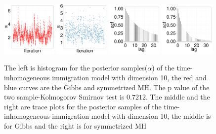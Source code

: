   \begin{figure}[H]
  \centering
  \begin{minipage}[!hp]{0.99\linewidth}
    \includegraphics [width=0.24\textwidth, angle=0]{figs/QC_ks/qc_traceGBS_4_03_10_.pdf}
    \includegraphics [width=0.24\textwidth, angle=0]{figs/QC_ks/qc_traceMH_4_03_10_.pdf}
    \includegraphics [width=0.24\textwidth, angle=0]{figs/QC_ks/qc_gbsacf_4_03_10_.pdf}
    \includegraphics [width=0.24\textwidth, angle=0]{figs/QC_ks/qc_mhacf_4_03_10_.pdf}
  \end{minipage}

    \caption{The left is histogram for the posterior samples($\alpha$) of the time-inhomogeneous immigration model with dimension 10, the red and blue curves are the Gibbs and symmetrized MH. The p value of the two sample-Kolmogorov Smirnov test is $ 0.7212$. The middle and the right are trace plots for the posterior samples of the time-inhomogeneous immigration model with dimension 10, the middle is for Gibbs and the right is for symmetrized MH}
     \label{fig:TRACE_CQ}
  \end{figure}


